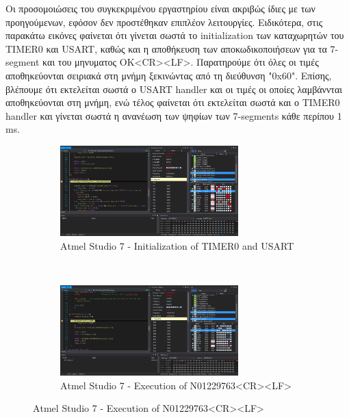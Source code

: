\documentclass{article}
\begin{document}
	\noindent
	Οι προσομοιώσεις του συγκεκριμένου εργαστηρίου είναι ακριβώς ίδιες με των προηγούμενων, εφόσον δεν προστέθηκαν επιπλέον λειτουργίες. Eιδικότερα, στις παρακάτω εικόνες φαίνεται ότι γίνεται σωστά το initialization των καταχωρητών του TIMER0 και USART, καθώς και η αποθήκευση των αποκωδικοποιήσεων για τα 7-segment και του μηνυματος OK<CR><LF>. Παρατηρούμε ότι όλες οι τιμές αποθηκεύονται σειριακά στη μνήμη ξεκινώντας από τη διεύθυνση "0x60". Eπίσης, βλέπουμε ότι εκτελείται σωστά ο USART handler και οι τιμές οι οποίες λαμβάννται αποθηκεύονται στη μνήμη, ενώ τέλος φαίνεται ότι εκτελείται σωστά και ο TIMER0 handler και γίνεται σωστά η ανανέωση των ψηφίων των 7-segments κάθε περίπου 1 ms.
	\pagebreak
	\begin{figure}[h!]
		\centering
		\begin{subfigure}[t]{0.5\textwidth}
			\centering
			\includegraphics[height=3.5cm, width=\linewidth]{./results/lab5_sim_init.png}
			\caption{Αtmel Studio 7 - Initialization of TIMER0 and USART}
		\end{subfigure}%
		~
		\begin{subfigure}[t]{0.5\textwidth}
			\centering
			\includegraphics[height=3.5cm, width=\linewidth]{./results/lab5_sim_num_instruction.png}
			\caption{Αtmel Studio 7 - Execution of N01229763<CR><LF>}
		\end{subfigure}
		

\end{figure}
\end{document}
